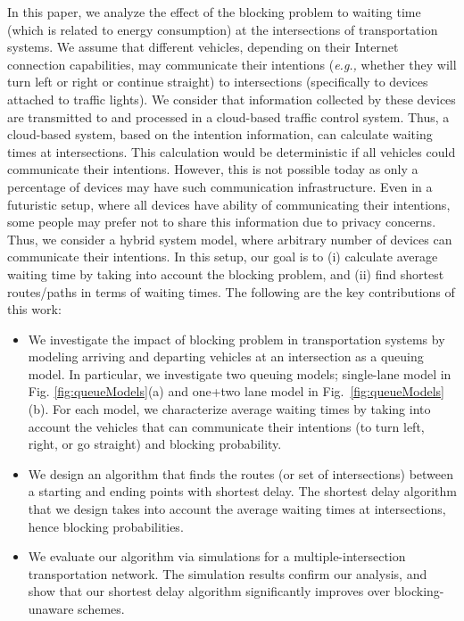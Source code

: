 \documentclass[conference]{IEEEtran}
\newcommand{\eg}{{\em e.g., }}
\begin{document}
In this paper, we analyze the effect of the blocking problem to waiting time (which is related to energy consumption) at the intersections of transportation systems. We assume that different vehicles, depending on their Internet connection capabilities, may communicate their intentions (\eg whether they will turn left or right or continue straight) to intersections (specifically to devices attached to traffic lights). We consider that information collected by these devices are transmitted to and processed in a cloud-based traffic control system. Thus, a cloud-based system, based on the intention information, can calculate waiting times at intersections. This calculation would be deterministic if all vehicles could communicate their intentions. However, this is not possible today as only a percentage of devices may have such communication infrastructure. Even in a futuristic setup, where all devices have ability of communicating their intentions, some people may prefer not to share this information due to privacy concerns.  Thus, we consider a hybrid system model, where arbitrary number of devices can communicate their intentions. In this setup, our goal is to (i) calculate average waiting time by taking into account the blocking problem, and (ii) find shortest routes/paths in terms of waiting times. The following are the key contributions of this work:
\begin{itemize}
\item We investigate the impact of blocking problem in transportation systems by modeling arriving and departing vehicles at an intersection as a queuing model. In particular, we investigate two queuing models; single-lane model in Fig. \ref{fig:queueModels}(a) and one+two lane model in Fig.~\ref{fig:queueModels}(b). For each model, we characterize average waiting times by taking into account the vehicles that can communicate their intentions (to turn left, right, or go straight) and blocking probability.
\item We design an algorithm that finds the routes (or set of intersections) between a starting and ending points with shortest delay. The shortest delay algorithm that we design takes into account the average waiting times at intersections, hence blocking probabilities.
\item We evaluate our algorithm via simulations for a multiple-intersection transportation network. The simulation results confirm our analysis, and show that our shortest delay algorithm significantly improves over blocking-unaware schemes.
\end{itemize}
\end{document}

